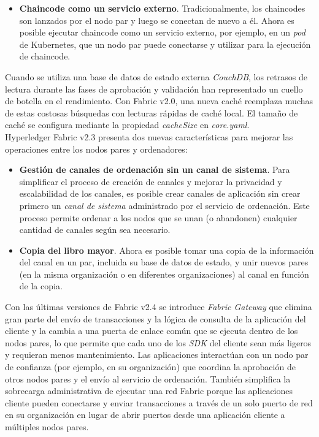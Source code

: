 {\begin{itemize}
\item {\bf Chaincode como un servicio externo}. Tradicionalmente, los chaincodes son lanzados por el nodo par y luego se conectan de nuevo a \'el. Ahora es posible ejecutar chaincode como un servicio externo, por ejemplo, en un \emph{pod} de Kubernetes, que un nodo par puede conectarse y utilizar para la ejecuci\'on de chaincode.
\end{itemize}

Cuando se utiliza una base de datos de estado externa \emph{CouchDB}, los retrasos de lectura durante las fases de aprobaci\'on y validaci\'on han representado un cuello de botella en el rendimiento. Con Fabric v2.0, una nueva cach\'e reemplaza muchas de estas costosas b\'usquedas con lecturas r\'apidas de cach\'e local. El tama\~no de cach\'e se configura mediante la propiedad \emph{cacheSize} en \emph{core.yaml}.\\

Hyperledger Fabric v2.3 presenta dos nuevas caracter\'isticas para mejorar las operaciones entre los nodos pares y ordenadores:

\begin{itemize}
\item {\bf Gesti\'on de canales de ordenaci\'on sin un canal de sistema}. Para simplificar el proceso de creaci\'on de canales y mejorar la privacidad y escalabilidad de los canales, es posible crear canales de aplicaci\'on sin crear primero un \emph{canal de sistema} administrado por el servicio de ordenaci\'on. Este proceso permite ordenar a los nodos que se unan (o abandonen) cualquier cantidad de canales seg\'un sea necesario.

\item {\bf Copia del libro mayor}. Ahora es posible tomar una copia de la informaci\'on del canal en un par, incluida su base de datos de estado, y unir nuevos pares (en la misma organizaci\'on o en diferentes organizaciones) al canal en funci\'on de la copia.
\end{itemize}

Con las \'ultimas versiones de Fabric v2.4 se introduce \emph{Fabric Gateway} que elimina gran parte del env\'io de transacciones y la l\'ogica de consulta de la aplicaci\'on del cliente y la cambia a una puerta de enlace com\'un que se ejecuta dentro de los nodos pares, lo que permite que cada uno de los \emph{SDK} del cliente sean m\'as ligeros y requieran menos mantenimiento. Las aplicaciones interact\'uan con un nodo par de confianza (por ejemplo, en su organizaci\'on) que coordina la aprobaci\'on de otros nodos pares y el env\'io al servicio de ordenaci\'on. Tambi\'en simplifica la sobrecarga administrativa de ejecutar una red Fabric porque las aplicaciones cliente pueden conectarse y enviar transacciones a trav\'es de un solo puerto de red en su organizaci\'on en lugar de abrir puertos desde una aplicaci\'on cliente a m\'ultiples nodos pares.

}
